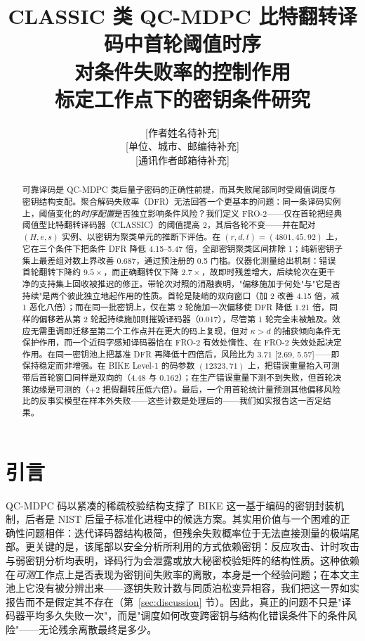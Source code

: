 \documentclass[UTF8,a4paper,10pt,twocolumn]{ctexart}
\title{\vspace{-1.2em}\heiti\zihao{3} CLASSIC 类 QC-MDPC 比特翻转译码中首轮阈值时序\\对条件失败率的控制作用\\[0.35em]
\zihao{5}\mdseries 标定工作点下的密钥条件研究}
\author{\zihao{5} [作者姓名待补充]\\[0.2em]
\zihao{6} [单位、城市、邮编待补充]\\[0.2em]
\zihao{6} [通讯作者邮箱待补充]}
\date{}
\begin{document}
\maketitle
\thispagestyle{empty}

\begin{abstract}
可靠译码是 QC-MDPC 类后量子密码的正确性前提，而其失败尾部同时受阈值调度与密钥结构支配。聚合解码失败率（DFR）无法回答一个更基本的问题：同一条译码实例上，阈值变化的\emph{时序配置}是否独立影响条件风险？我们定义 FRO-2——仅在首轮把经典阈值型比特翻转译码器（CLASSIC）的阈值提高 2，其后各轮不变——并在配对 $(H,e,s)$ 实例、以密钥为聚类单元的推断下评估。在 $(r,d,t)=(4801,45,92)$ 上，它在三个条件下把条件 DFR 降低 4.15--5.47 倍，全部密钥聚类区间排除 1；纯新密钥子集上最差组对数上界改善 0.687，通过预注册的 0.5 门槛。仪器化测量给出机制：错误首轮翻转下降约 $9.5\times$，而正确翻转仅下降 $2.7\times$，故即时残差增大，后续轮次在更干净的支持集上回收被推迟的修正。带轮次对照的消融表明，"偏移施加于何处"与"它是否持续"是两个彼此独立地起作用的性质。首轮是陡峭的双向窗口（加 2 改善 4.15 倍，减 1 恶化八倍）；而在同一批密钥上，仅在第 2 轮施加一次偏移使 DFR 降低 1.21 倍，同样的偏移若从第 2 轮起持续施加则摧毁译码器（0.017），尽管第 1 轮完全未被触及。效应无需重调即迁移至第二个工作点并在更大的码上复现，但对 $\kappa>d$ 的捕获倾向条件无保护作用，而一个近码字感知译码器恰在 FRO-2 有效处惰性、在 FRO-2 失效处起决定作用。在同一密钥池上把基准 DFR 再降低十四倍后，风险比为 3.71 [2.69, 5.57]——即保持稳定而非增强。在 BIKE Level-1 的码参数 $(12323,71)$ 上，把错误重量抬入可测带后首轮窗口同样是双向的（4.48 与 0.162）；在生产错误重量下测不到失败，但首轮决策边缘是可测的（$+2$ 把假翻转压低六倍）。最后，一个用首轮统计量预测其他偏移风险比的反事实模型在样本外失败——这些计数是处理后的——我们如实报告这一否定结果。
\end{abstract}

\vspace{1em}

\section{引言}\label{sec:intro}

QC-MDPC 码以紧凑的稀疏校验结构支撑了 BIKE 这一基于编码的密钥封装机制，后者是 NIST 后量子标准化进程中的候选方案\cite{misoczki2013mdpc,bike2024spec,alagic2025nist}。其实用价值与一个困难的正确性问题相伴：迭代译码器结构极简，但残余失败概率位于无法直接测量的极端尾部。更关键的是，该尾部以安全分析所利用的方式依赖密钥：反应攻击、计时攻击与弱密钥分析均表明，译码行为会泄露或放大秘密校验矩阵的结构性质\cite{guo2016key,eaton2018timing,wang2023weak,gellersen2025}。这种依赖在\emph{可测}工作点上是否表现为密钥间失败率的离散，本身是一个经验问题；在本文主池上它没有被分辨出来——逐钥失败计数与同质泊松变异相容，我们把这一界如实报告而不是假定其不存在（第~\ref{sec:discussion} 节）。因此，真正的问题不只是"译码器平均多久失败一次"，而是"调度如何改变跨密钥与结构化错误条件下的条件风险"——无论残余离散最终是多少。
\end{document}
